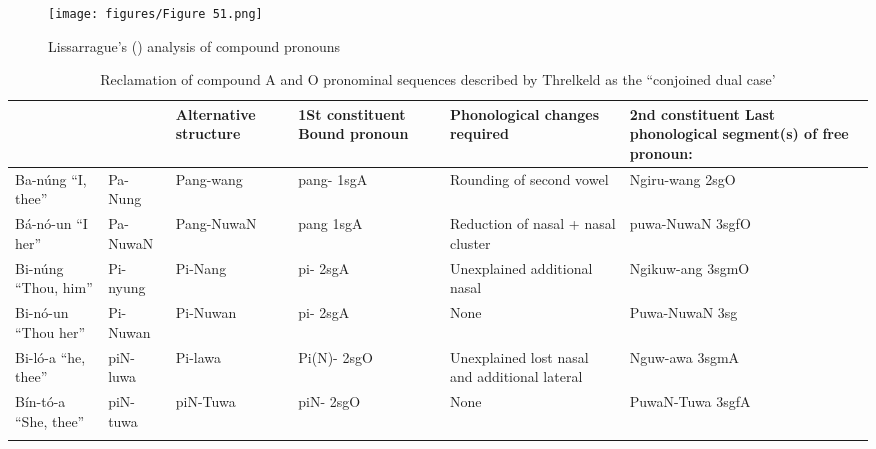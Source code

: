 \begin{figure}[t]
\texttt{[image: figures/Figure 51.png]}
\caption{Lissarrague's (\citeyear[47]{lissarrague_salvage_2006}) analysis of compound pronouns}
\label{fig:3:51} 
\end{figure}

	 
\begin{table}
\footnotesize
	\begin{tabularx}{\textwidth}{QQQQQQ}
		\lsptoprule
		\citet[24]{Threlkeld1834} & \citet[47]{Lissarrague2006} & Alternative structure & 1St constituent Bound pronoun & Phonological changes required & 2nd constituent Last phonological segment(s) of free pronoun:  \\
		\midrule
		Ba-núng “I, thee”	& Pa-Nung	& Pang-wang	& pang- 1sgA	& Rounding of second vowel	& Ngiru-wang 2sgO \\
		\tablevspace
		Bá-nó-un “I her”	& Pa-NuwaN	& Pang-NuwaN	& pang 1sgA	& Reduction of nasal + nasal cluster	& puwa-NuwaN 3sgfO \\
		\tablevspace
		Bi-núng “Thou, him”	& Pi-nyung	& Pi-Nang & pi- 2sgA	& Unexplained additional nasal	& Ngikuw-ang 3sgmO \\
		\tablevspace
		Bi-nó-un “Thou her”	& Pi-Nuwan	& Pi-Nuwan	& pi- 2sgA	& None	& Puwa-NuwaN 3sg \\
		\tablevspace
		Bi-ló-a “he, thee”	& piN-luwa	& Pi-lawa	& Pi(N)- 2sgO& 	Unexplained lost nasal and additional lateral	& Nguw-awa 3sgmA \\
		\tablevspace
		Bín-tó-a “She, thee” & piN-tuwa	& piN-Tuwa	& piN- 2sgO	& None	& PuwaN-Tuwa 3sgfA \\
		\lspbottomrule
	\end{tabularx}
	\caption{Reclamation of compound A and O pronominal sequences described by Threlkeld as the “conjoined dual case’}
	\label{tab:chap3:ReclamationThrelkeld}
\end{table}


